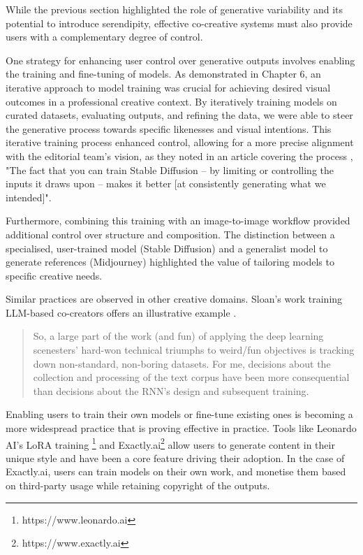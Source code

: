 While the previous section highlighted the role of generative variability and its potential to introduce serendipity, effective co-creative systems must also provide users with a complementary degree of control. 

One strategy for enhancing user control over generative outputs involves enabling the training and fine-tuning of models. As demonstrated in Chapter 6, an iterative approach to model training was crucial for achieving desired visual outcomes in a professional creative context. By iteratively training models on curated datasets, evaluating outputs, and refining the data, we were able to steer the generative process towards specific likenesses and visual intentions. This iterative training process enhanced control, allowing for a more precise alignment with the editorial team's vision, as they noted in an article covering the process \cite{Drummond2023-bh}, "The fact that you can train Stable Diffusion – by limiting or controlling the inputs it draws upon – makes it better [at consistently generating what we intended]".

Furthermore, combining this training with an image-to-image workflow provided additional control over structure and composition. The distinction between a specialised, user-trained model (Stable Diffusion) and a generalist model to generate references (Midjourney) highlighted the value of tailoring models to specific creative needs.

Similar practices are observed in other creative domains. Sloan's work training LLM-based co-creators offers an illustrative example \cite{Sloan2016-fj}. 

\begin{quote}
So, a large part of the work (and fun) of applying the deep learning scenesters' hard-won technical triumphs to weird/fun objectives is tracking down non-standard, non-boring datasets. For me, decisions about the collection and processing of the text corpus have been more consequential than decisions about the RNN's design and subsequent training.
\end{quote}

Enabling users to train their own models or fine-tune existing ones is becoming a more widespread practice that is proving effective in practice. Tools like Leonardo AI's LoRA training \footnote{https://www.leonardo.ai} and Exactly.ai\footnote{https://www.exactly.ai} allow users to generate content in their unique style and have been a core feature driving their adoption. In the case of Exactly.ai, users can train models on their own work, and monetise them based on third-party usage while retaining copyright of the outputs.

